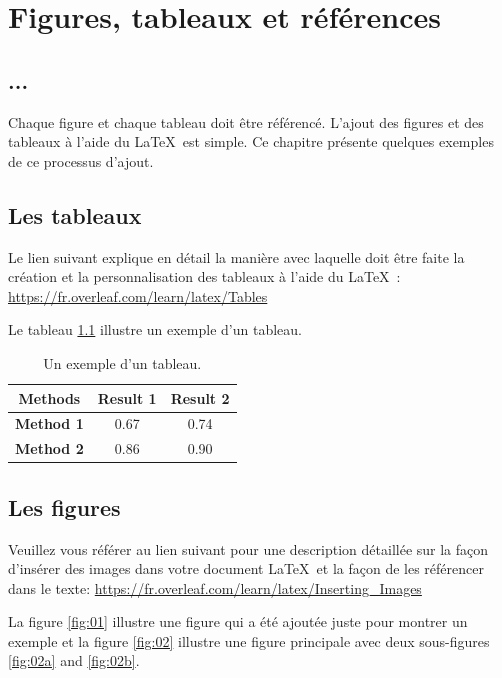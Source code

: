 \chapter{Figures, tableaux et références}

\section{...}
Chaque figure et chaque tableau doit être référencé. L'ajout des figures et des tableaux à l'aide du \LaTeX\ est simple. Ce chapitre présente quelques exemples de ce processus d'ajout.

\section{Les tableaux}
Le lien suivant explique en détail la manière avec laquelle doit être faite la création et la personnalisation des tableaux à l'aide du \LaTeX\ : \url{https://fr.overleaf.com/learn/latex/Tables}

Le tableau \ref{tab:01} illustre un exemple d'un tableau.

\begin{table}[h]
\centering
\caption{Un exemple d'un tableau.}
\label{tab:01}
\begin{tabular}{|c|c|c|}
\hline
 \textbf{Methods} & \textbf{Result 1} & \textbf{Result 2} \\ 
 \hline
 \textbf{Method 1} & 0.67 & 0.74 \\  
 \hline
 \textbf{Method 2} & 0.86 & 0.90 \\
 \hline
\end{tabular}
\end{table}


\section{Les figures}
Veuillez vous référer au lien suivant pour une description détaillée sur la façon d'insérer des images dans votre document \LaTeX\ et la façon de les référencer dans le texte: \url{https://fr.overleaf.com/learn/latex/Inserting_Images}

La figure \ref{fig:01} illustre une figure qui a été ajoutée juste pour montrer un exemple et la figure \ref{fig:02} illustre une figure principale avec deux sous-figures \ref{fig:02a} and \ref{fig:02b}.

